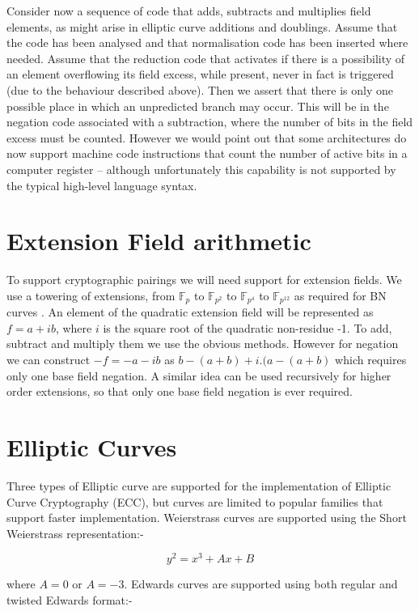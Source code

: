 \documentclass{llncs}
\newcommand{\F}{\mathbb{F}}
\begin{document}
Consider now a sequence of code that adds, subtracts and multiplies field elements, as might arise in elliptic curve additions and doublings. Assume that the code has been analysed and that normalisation 
code has been inserted where needed. Assume that the reduction code that 
activates if there is a possibility of an element overflowing its field excess, while present, never in fact is triggered (due to the behaviour described above). Then we assert that there is only one 
possible place in which an unpredicted branch may occur. This will be in the negation code associated with a subtraction, where the number of bits in the field excess must be counted. However we would 
point out that some architectures do now support machine code instructions that count the number of active bits in a computer register -- although unfortunately this capability is not supported by the 
typical high-level language syntax.

\section{Extension Field arithmetic}

To support cryptographic pairings we will need support for extension fields. We use a towering of extensions, from $\F_p$ to $\F_{p^2}$ to $\F_{p^4}$ to $\F_{p^{12}}$ as required for 
BN curves \cite{barreto-naehrig}. An element 
of the quadratic extension field will be represented as $f=a+ib$, where $i$ is the square root of the quadratic non-residue -1.
To add, subtract and multiply them we use the obvious methods. However for negation we can construct $-f=-a-ib$ as $b-(a+b)+i.(a-(a+b)$ which requires only one base field negation. A similar idea 
can be used recursively for higher order extensions, so that only one base field negation is ever required.


\section{Elliptic Curves}

Three types of Elliptic curve are supported for the implementation of Elliptic Curve Cryptography (ECC), but curves are limited to popular families that support faster implementation. Weierstrass 
curves are supported using the Short Weierstrass representation:-

$$ y^2=x^3+Ax+B $$

where $A=0$ or $A=-3$. Edwards curves are supported using both regular and twisted Edwards format:-
\end{document}
